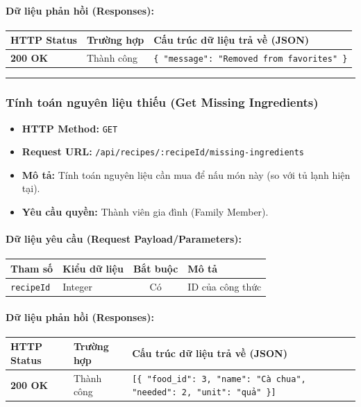 \documentclass[12pt,a4paper]{article}
\begin{document}
\paragraph{Dữ liệu phản hồi (Responses):}
\begin{longtable}{|p{2.8cm}|p{3.2cm}|p{8.0cm}|}
\hline
\textbf{HTTP Status} & \textbf{Trường hợp} & \textbf{Cấu trúc dữ liệu trả về (JSON)} \\ \hline
\endhead
\textbf{200 OK} & Thành công & \texttt{\{ "message": "Removed from favorites" \}} \\ \hline
\end{longtable}

\vskip 0.4cm
\noindent\rule{\textwidth}{0.3pt}
\vskip 0.4cm

\subsubsection{Tính toán nguyên liệu thiếu (Get Missing Ingredients)}
\begin{itemize}[leftmargin=*]
    \item \textbf{HTTP Method:} \texttt{GET}
    \item \textbf{Request URL:} \texttt{/api/recipes/:recipeId/missing-ingredients}
    \item \textbf{Mô tả:} Tính toán nguyên liệu cần mua để nấu món này (so với tủ lạnh hiện tại).
    \item \textbf{Yêu cầu quyền:} Thành viên gia đình (Family Member).
\end{itemize}

\paragraph{Dữ liệu yêu cầu (Request Payload/Parameters):}
\begin{longtable}{|p{2.8cm}|p{2.2cm}|c|p{7.0cm}|}
\hline
\textbf{Tham số} & \textbf{Kiểu dữ liệu} & \textbf{Bắt buộc} & \textbf{Mô tả} \\ \hline
\endhead
\texttt{recipeId} & Integer & Có & ID của công thức \\ \hline
\end{longtable}

\paragraph{Dữ liệu phản hồi (Responses):}
\begin{longtable}{|p{2.8cm}|p{3.2cm}|p{8.0cm}|}
\hline
\textbf{HTTP Status} & \textbf{Trường hợp} & \textbf{Cấu trúc dữ liệu trả về (JSON)} \\ \hline
\endhead
\textbf{200 OK} & Thành công & \texttt{[\{ "food\_id": 3, "name": "Cà chua", "needed": 2, "unit": "quả" \}]} \\ \hline
\end{longtable}
\end{document}
